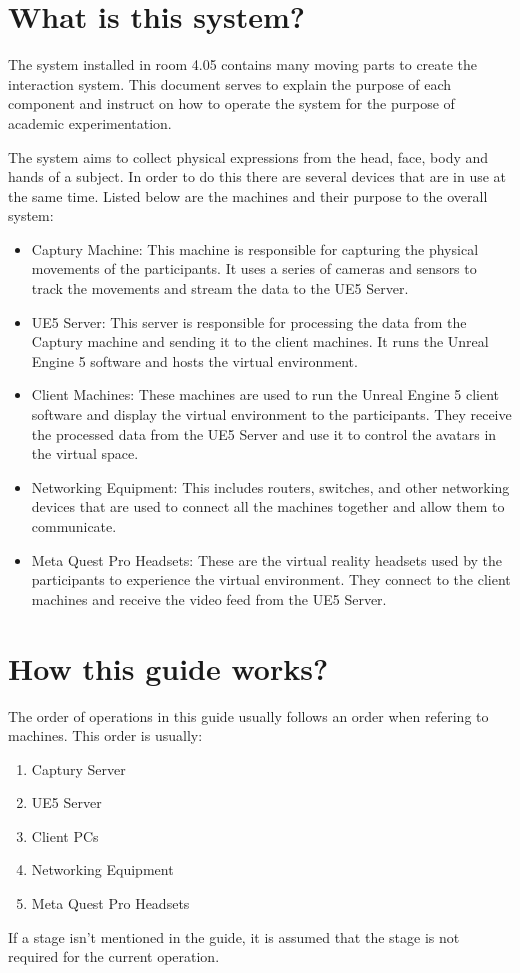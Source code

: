 \section{What is this system?}
The system installed in room 4.05 contains many moving parts to create the interaction system. This document serves to explain the purpose of each component and instruct on how to operate the system for the purpose of academic experimentation.

The system aims to collect physical expressions from the head, face, body and hands of a subject. In order to do this there are several devices that are in use at the same time. Listed below are the machines and their purpose to the overall system:

\begin{itemize}
    \item Captury Machine: This machine is responsible for capturing the physical movements of the participants. It uses a series of cameras and sensors to track the movements and stream the data to the UE5 Server.
    \item UE5 Server: This server is responsible for processing the data from the Captury machine and sending it to the client machines. It runs the Unreal Engine 5 software and hosts the virtual environment.
    \item Client Machines: These machines are used to run the Unreal Engine 5 client software and display the virtual environment to the participants. They receive the processed data from the UE5 Server and use it to control the avatars in the virtual space.
    \item Networking Equipment: This includes routers, switches, and other networking devices that are used to connect all the machines together and allow them to communicate.
    \item Meta Quest Pro Headsets: These are the virtual reality headsets used by the participants to experience the virtual environment. They connect to the client machines and receive the video feed from the UE5 Server.
\end{itemize}



\section{How this guide works?}
The order of operations in this guide usually follows an order when refering to machines. This order is usually:
\begin{enumerate}
    \item Captury Server
    \item UE5 Server
    \item Client PCs
    \item Networking Equipment
    \item Meta Quest Pro Headsets
\end{enumerate}
If a stage isn't mentioned in the guide, it is assumed that the stage is not required for the current operation.